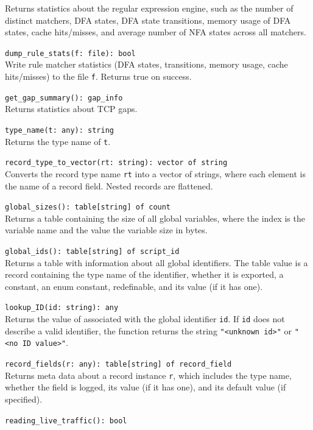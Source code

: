 \documentclass[10pt,landscape]{article}
\newcommand{\ReturnsTrueOnSuccess}{Returns true on success.\xspace}
\begin{document}
\begin{multicols*}{2}
\begin{itemize}
{    Returns statistics about the regular expression engine, such as the number
    of distinct matchers, DFA states, DFA state transitions, memory usage of
    DFA states, cache hits/misses, and average number of NFA states across all
    matchers.
  \item \verb|dump_rule_stats(f: file): bool|\\
    Write rule matcher statistics (DFA states, transitions, memory usage, cache
    hits/misses) to the file \verb|f|.
    \ReturnsTrueOnSuccess
  \item \verb|get_gap_summary(): gap_info|\\
    Returns statistics about TCP gaps.
  \item \verb|type_name(t: any): string|\\
    Returns the type name of \texttt{t}.
  \item \verb|record_type_to_vector(rt: string): vector of string|\\
    Converts the record type name \texttt{rt} into a vector of strings, where
    each element is the name of a record field. Nested records are flattened.
  \item \verb|global_sizes(): table[string] of count|\\
    Returns a table containing the size of all global variables, where the
    index is the variable name and the value the variable size in bytes.
  \item \verb|global_ids(): table[string] of script_id|\\
    Returns a table with information about all global identifiers. The table
    value is a record containing the type name of the identifier, whether it is
    exported, a constant, an enum constant, redefinable, and its value (if it
    has one).
  \item \verb|lookup_ID(id: string): any|\\
    Returns the value of associated with the global identifier \verb|id|. If
    \verb|id| does not describe a valid identifier, the function returns the
    string \verb|"<unknown id>"| or \verb|"<no ID value>"|.
  \item \verb|record_fields(r: any): table[string] of record_field|\\
    Returns meta data about a record instance \verb|r|, which includes the
    type name, whether the field is logged, its value (if it has one), and its
    default value (if specified).
  \item \verb|reading_live_traffic(): bool|\\
}
\end{itemize}
\end{multicols*}
\end{document}
